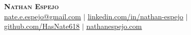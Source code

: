 \documentclass[letterpaper,11pt]{article}
\begin{document}
\begin{center}
    \textbf{\Huge \scshape Nathan Espejo} \\ \vspace{1pt}
    \small \href{mailto:nate.e.espejo@gmail.com}{\underline{nate.e.espejo@gmail.com}} $|$
    \href{https://www.linkedin.com/in/nathan-espejo}{\underline{linkedin.com/in/nathan-espejo}} $|$
    \href{https://github.com/HasNate618}{\underline{github.com/HasNate618}} $|$
    \href{https://nathanespejo.com}{\underline{nathanespejo.com}}
\end{center}

\end{document}
